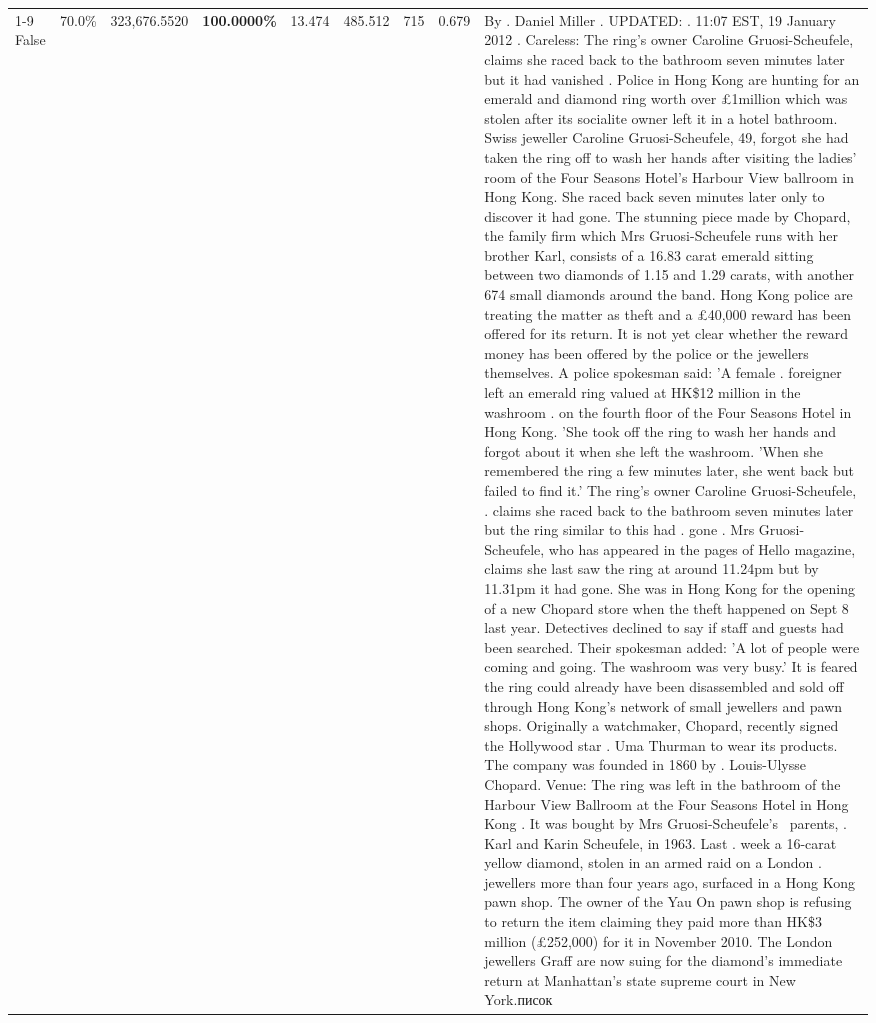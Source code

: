\begin{table}[H]
\begin{tabular}{lllrlllll}
\cline{1-9}
False & 70.0\% & 323,676.5520 & \bfseries \color{red} 100.0000\% & 13.474 & 485.512 & 715 & 0.679 & By . Daniel Miller . UPDATED: . 11:07 EST, 19 January 2012 . Careless: The ring's owner Caroline Gruosi-Scheufele, claims she raced back to the bathroom seven minutes later but it had vanished . Police in Hong Kong are hunting for an emerald and diamond ring worth over £1million which was stolen after its socialite owner left it in a hotel bathroom. Swiss jeweller Caroline Gruosi-Scheufele, 49, forgot she had taken the ring off to wash her hands after visiting the ladies' room of the Four Seasons Hotel's Harbour View ballroom in Hong Kong. She raced back seven minutes later only to discover it had gone. The stunning piece made by Chopard, the family firm which Mrs Gruosi-Scheufele runs with her brother Karl, consists of a 16.83 carat emerald sitting between two diamonds of 1.15 and 1.29 carats, with another 674 small diamonds around the band. Hong Kong police are treating the matter as theft and a £40,000 reward has been offered for its return. It is not yet clear whether the reward money has been offered by the police or the jewellers themselves. A police spokesman said: 'A female . foreigner left an emerald ring valued at HK\$12 million in the washroom . on the fourth floor of the Four Seasons Hotel in Hong Kong. 'She took off the ring to wash her hands and forgot about it when she left the washroom. 'When she remembered the ring a few minutes later, she went back but failed to find it.' The ring's owner Caroline Gruosi-Scheufele, . claims she raced back to the bathroom seven minutes later but the ring similar to this had . gone . Mrs Gruosi-Scheufele, who has appeared in the pages of Hello magazine, claims she last saw the ring at around 11.24pm but by 11.31pm it had gone. She was in Hong Kong for the opening of a new Chopard store when the theft happened on Sept 8 last year. Detectives declined to say if staff and guests had been searched. Their spokesman added: 'A lot of people were coming and going. The washroom was very busy.' It is feared the ring could already have been disassembled and sold off through Hong Kong's network of small jewellers and pawn shops. Originally a watchmaker, Chopard, recently signed the Hollywood star . Uma Thurman to wear its products. The company was founded in 1860 by . Louis-Ulysse Chopard. Venue: The ring was left in the bathroom of the Harbour View Ballroom at the Four Seasons Hotel in Hong Kong . It was bought by Mrs Gruosi-Scheufele's  parents, . Karl and Karin Scheufele, in 1963. Last . week a 16-carat yellow diamond, stolen in an armed raid on a London . jewellers more than four years ago, surfaced in a Hong Kong pawn shop. The owner of the Yau On pawn shop is refusing to return the item claiming they paid more than HK\$3 million (£252,000) for it in November 2010. The London jewellers Graff are now suing for the diamond’s immediate return at Manhattan’s state supreme court in New York.писок \\

\end{tabular}
\end{table}
